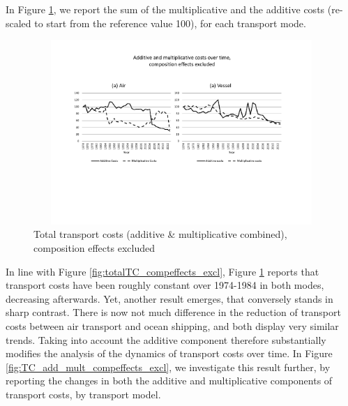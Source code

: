 \documentclass[a4paper,11pt]{article}
\begin{document}
In Figure \ref{fig:TC_addplusmult_compeffects_excl}, we report the sum of the multiplicative and the additive costs (re-scaled to start from the reference value 100), for each transport mode. 

\begin{figure}[htbp]
\caption{Total transport costs (additive \& multiplicative combined), 
composition effects excluded}
\label{fig:TC_addplusmult_compeffects_excl}
\begin{center}
\includegraphics[width=14cm, height=7cm]{Fig3b_TCovertime_add_et_mult_3d.pdf}
\end{center}
\end{figure}

In line with Figure \ref{fig:totalTC_compeffects_excl}, Figure \ref{fig:TC_addplusmult_compeffects_excl} reports that transport costs have been roughly constant over 1974-1984 in both modes, decreasing afterwards. Yet, another result emerges, that conversely stands in sharp contrast. There is now not much difference in the reduction of transport costs between air transport and ocean shipping, and both display very similar trends. Taking into account the additive component therefore substantially modifies the analysis of the dynamics of transport costs over time. In Figure \ref{fig:TC_add_mult_compeffects_excl}, we investigate this result further, by reporting the changes in both the additive and multiplicative components of transport costs, by transport model.
\end{document}
